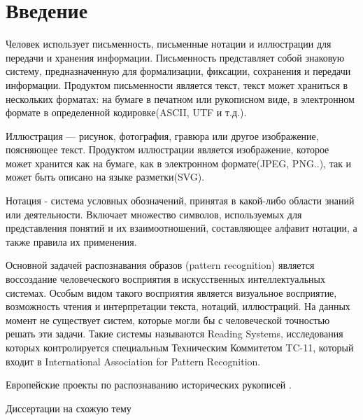 \chapter*{Введение}                         %



Человек использует письменность, письменные нотации и иллюстрации для передачи и хранения информации. Письменность представляет собой знаковую систему, предназначенную для формализации, фиксации, сохранения и передачи информации. Продуктом письменности является текст, текст может храниться в нескольких форматах: на бумаге в печатном или рукописном виде, в электронном формате в определенной кодировке(ASCII, UTF\cite{unicode1991unicode} и т.д.).

Иллюстрация — рисунок, фотография, гравюра или другое изображение, поясняющее текст. Продуктом иллюстрации является изображение, которое может хранится как на бумаге, как в электронном формате(JPEG, PNG..), так и может быть описано на языке разметки(SVG).

Нотация - система условных обозначений, принятая в какой-либо области знаний или деятельности. Включает множество символов, используемых для представления понятий и их взаимоотношений, составляющее алфавит нотации, а также правила их применения.

Основной задачей распознавания образов (pattern recognition) является воссоздание человеческого восприятия в искусственных интеллектуальных системах. Особым видом такого восприятия является визуальное восприятие, возможность чтения и интерпретации текста, нотаций, иллюстраций. На данных момент не существует систем, которые могли бы с человеческой точностью решать эти задачи. Такие системы называются Reading Systems, исследования которых контролируется специальным Техническим Коммитетом TC-11, который входит в International Association for Pattern Recognition.

Европейские проекты по распознаванию исторических рукописей \cite{vidal2014d5, romero2012multimodal}.

Диссертации на схожую тему \cite{guillevic1995unconstrained, vinciarelli2003offline, tay2002offline, fischer2012handwriting, romero2012multimodal}